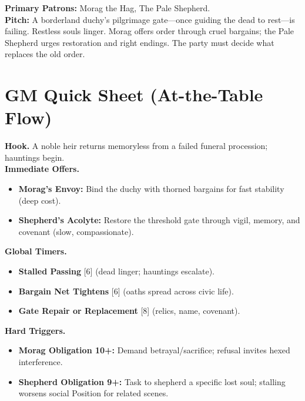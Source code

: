 \documentclass[11pt]{article}
\newcommand{\timer}[1]{\textsc{[#1]}}
\begin{document}


\vspace{-1.25em}

\noindent\textbf{Primary Patrons:} Morag the Hag, The Pale Shepherd.\\
\textbf{Pitch:} A borderland duchy's pilgrimage gate---once guiding the dead to rest---is failing. Restless souls linger. Morag offers order through cruel bargains; the Pale Shepherd urges restoration and right endings. The party must decide what replaces the old order.

\section*{GM Quick Sheet (At-the-Table Flow)}
\textbf{Hook.} A noble heir returns memoryless from a failed funeral procession; hauntings begin.\\
\textbf{Immediate Offers.}
\begin{itemize}
  \item \textbf{Morag's Envoy:} Bind the duchy with thorned bargains for fast stability (deep cost).
  \item \textbf{Shepherd's Acolyte:} Restore the threshold gate through vigil, memory, and covenant (slow, compassionate).
\end{itemize}
\textbf{Global Timers.}
\begin{itemize}
  \item \textbf{Stalled Passing} \timer{6} (dead linger; hauntings escalate).
  \item \textbf{Bargain Net Tightens} \timer{6} (oaths spread across civic life).
  \item \textbf{Gate Repair or Replacement} \timer{8} (relics, name, covenant).
\end{itemize}
\textbf{Hard Triggers.}
\begin{itemize}
  \item \textbf{Morag Obligation 10+:} Demand betrayal/sacrifice; refusal invites hexed interference.
  \item \textbf{Shepherd Obligation 9+:} Task to shepherd a specific lost soul; stalling worsens social Position for related scenes.
\end{itemize}
\end{document}
